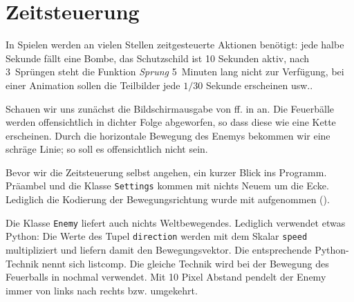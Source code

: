 \section{Zeitsteuerung}\label{secZeitstuerung}
In Spielen werden an vielen Stellen zeitgesteuerte Aktionen benötigt: jede halbe Sekunde fällt eine Bombe, das Schutzschild ist 10 Sekunden aktiv, nach 3~Sprüngen steht die Funktion \emph{Sprung} 5~Minuten lang nicht zur Verfügung, bei einer Animation sollen die Teilbilder jede $1/30$ Sekunde erscheinen usw..

Schauen wir uns zunächst die Bildschirmausgabe von ff. in  an. Die Feuerbälle werden offensichtlich in dichter Folge abgeworfen, so dass diese wie eine Kette erscheinen. Durch die horizontale Bewegung des Enemys bekommen wir eine schräge Linie; so soll es offensichtlich nicht sein. 


Bevor wir die Zeitsteuerung selbst angehen, ein kurzer Blick ins Programm. Präambel und die Klasse \texttt{Settings} kommen mit nichts Neuem um die Ecke. Lediglich die Kodierung der Bewegungsrichtung wurde mit aufgenommen (). 


Die Klasse \texttt{Enemy} liefert auch nichts Weltbewegendes. Lediglich  verwendet etwas Python: Die Werte des Tupel \texttt{direction} werden mit dem Skalar \texttt{speed} multipliziert und liefern damit den Bewegungsvektor. Die entsprechende Python-Technik nennt sich \gls{listcomp}. Die gleiche Technik wird bei der Bewegung des Feuerballs in  nochmal verwendet. Mit 10 Pixel Abstand pendelt der Enemy immer von links nach rechts bzw. umgekehrt.


